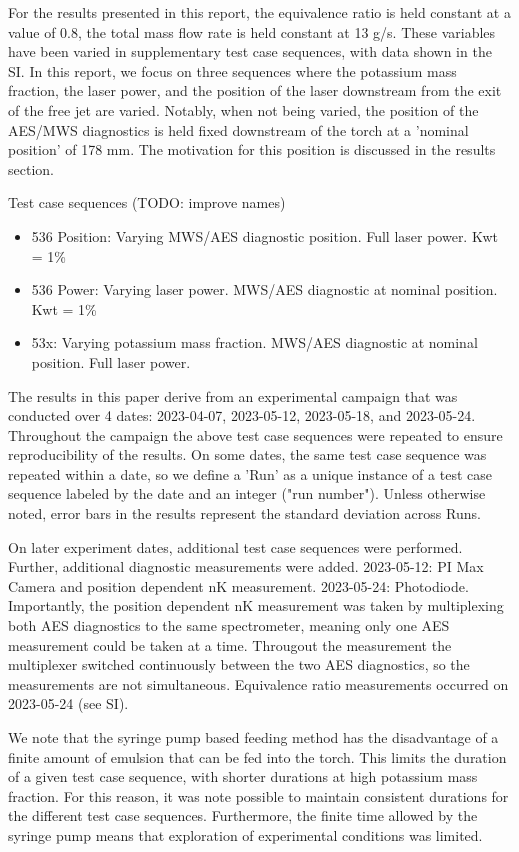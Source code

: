 For the results presented in this report, the equivalence ratio is held constant at a value of 0.8, the total mass flow rate is held constant at 13 g/s. These variables have been varied in supplementary test case sequences, with data shown in the SI. In this report, we focus on three sequences where the potassium mass fraction, the laser power, and the position of the laser downstream from the exit of the free jet are varied. Notably, when not being varied, the position of the AES/MWS diagnostics is held fixed downstream of the torch at a 'nominal position' of 178 mm. The motivation for this position is discussed in the results section. 

Test case sequences (TODO: improve names)
\begin{itemize}
    \item 536 Position: Varying MWS/AES diagnostic position. Full laser power. Kwt = 1\%
    \item 536 Power: Varying laser power. MWS/AES diagnostic at nominal position. Kwt = 1\%
    \item 53x: Varying potassium mass fraction. MWS/AES diagnostic at nominal position. Full laser power.
\end{itemize}


The results in this paper derive from an experimental campaign that was conducted over 4 dates: 2023-04-07, 2023-05-12, 2023-05-18, and 2023-05-24. Throughout the campaign the above test case sequences were repeated to ensure reproducibility of the results. On some dates, the same test case sequence was repeated within a date, so we define a 'Run' as a unique instance of a test case sequence labeled by the date and an integer ("run number").  Unless otherwise noted, error bars in the results represent the standard deviation across Runs. 

On later experiment dates, additional test case sequences were performed. Further, additional diagnostic measurements were added. 2023-05-12: PI Max Camera and position dependent nK measurement. 2023-05-24: Photodiode. Importantly, the position dependent nK measurement was taken by multiplexing both AES diagnostics to the same spectrometer, meaning only one AES measurement could be taken at a time. Througout the measurement the multiplexer switched continuously between the two AES diagnostics, so the measurements are not simultaneous. Equivalence ratio measurements occurred on 2023-05-24 (see SI). 

We note that the syringe pump based feeding method has the disadvantage of a finite amount of emulsion that can be fed into the torch. This limits the duration of a given test case sequence, with shorter durations at high potassium mass fraction. For this reason, it was note possible to maintain consistent durations for the different test case sequences. Furthermore, the finite time allowed by the syringe pump means that exploration of experimental conditions was limited. 

